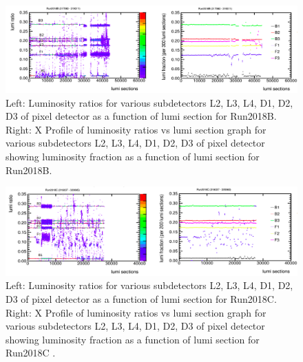 \begin{figure}[H]
  \centering
  \includegraphics[width=1\columnwidth]{./tjag3-rger6.png}
  \caption{Left: Luminosity ratios for various subdetectors L2, L3, L4, D1, D2, D3 of pixel detector as a function of lumi section for Run2018B. Right: X Profile of luminosity ratios vs lumi section graph for various subdetectors L2, L3, L4, D1, D2, D3 of pixel detector showing luminosity fraction as a function of lumi section for Run2018B. }
  \label{fig:CMS}
\end{figure}



\begin{figure}[H]
  \centering
  \includegraphics[width=1\columnwidth]{./tfkx3-uyzgt.png}
  \caption{Left: Luminosity ratios for various subdetectors L2, L3, L4, D1, D2, D3 of pixel detector as a function of lumi section for Run2018C. Right: X Profile of luminosity ratios vs lumi section graph for various subdetectors L2, L3, L4, D1, D2, D3 of pixel detector showing luminosity fraction as a function of lumi section for Run2018C \cite{lumidpg}.}
  \label{fig:CMS}
\end{figure}




